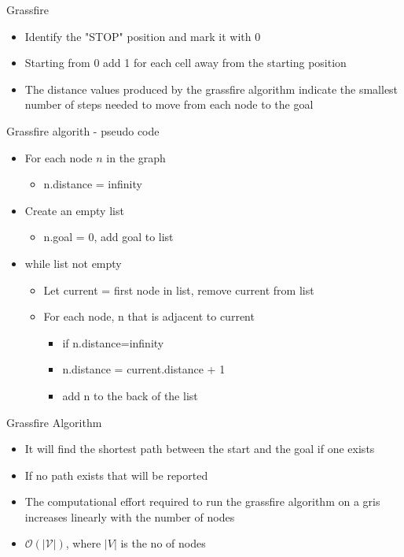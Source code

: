 \documentclass[10pt,mathserif]{beamer}
\begin{document}
\begin{frame}{Grassfire}
\begin{itemize}
\item Identify the "STOP" position and mark it with 0
\item Starting from 0 add 1 for each cell away from the starting position
\item The distance values produced by the grassfire algorithm indicate the smallest number
of steps needed to move from each node to the goal
\end{itemize}
\end{frame}

\begin{frame}{Grassfire algorith - pseudo code}
\begin{itemize}
\item For each node $n$ in the graph
\begin{itemize}
\item n.distance = infinity
\end{itemize}
\item Create an empty list
\begin{itemize}
\item n.goal = 0, add goal to list 
\end{itemize}
\item while list not empty
\begin{itemize}
\item Let current = first node in list, remove current from list
\item For each node, n that is adjacent to current
\begin{itemize}
\item if n.distance=infinity
\item n.distance = current.distance + 1
\item add n to the back of the list
\end{itemize}
\end{itemize}
\end{itemize}
\end{frame}

\begin{frame}{Grassfire Algorithm}
\begin{itemize}
\item It will find the shortest path between the start and the goal if one exists
\item If no path exists that will be reported
\item The computational effort required to run the grassfire algorithm on a gris increases linearly with the number of nodes
\item $\mathcal{O(|V|)}$, where $|V|$ is the no of nodes
\end{itemize}
\end{frame}
\end{document}
